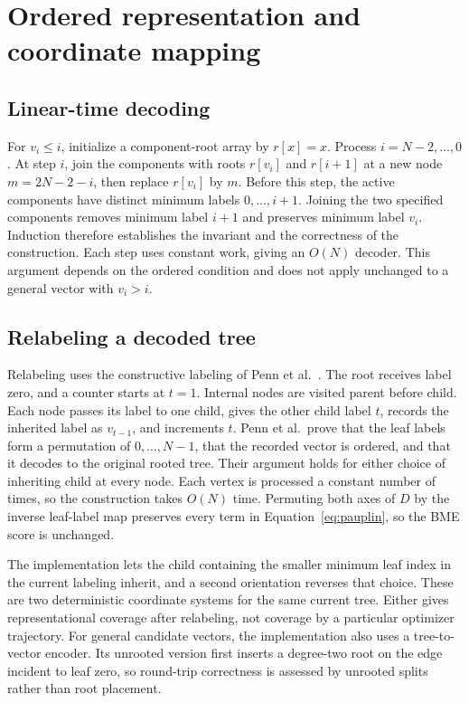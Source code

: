 \section{Ordered representation and coordinate mapping}
\label{sec:gauge}

\subsection{Linear-time decoding}

For $v_i\leq i$, initialize a component-root array by $r[x]=x$.
Process $i=N-2,\ldots,0$.
At step $i$, join the components with roots $r[v_i]$ and $r[i+1]$ at a new node
$m=2N-2-i$, then replace $r[v_i]$ by $m$.
Before this step, the active components have distinct minimum labels $0,\ldots,i+1$.
Joining the two specified components removes minimum label $i+1$ and preserves minimum label $v_i$.
Induction therefore establishes the invariant and the correctness of the construction.
Each step uses constant work, giving an $O(N)$ decoder.
This argument depends on the ordered condition and does not apply unchanged to a general vector with $v_i>i$.

\subsection{Relabeling a decoded tree}

Relabeling uses the constructive labeling of Penn et al.~\cite[Lemmas~0.9--0.11]{penn2023gradme}.
The root receives label zero, and a counter starts at $t=1$.
Internal nodes are visited parent before child.
Each node passes its label to one child, gives the other child label $t$, records the inherited label as $v_{t-1}$, and increments $t$.
Penn et al.\ prove that the leaf labels form a permutation of $0,\ldots,N-1$, that the recorded vector is ordered, and that it decodes to the original rooted tree.
Their argument holds for either choice of inheriting child at every node.
Each vertex is processed a constant number of times, so the construction takes $O(N)$ time.
Permuting both axes of $D$ by the inverse leaf-label map preserves every term in Equation~\eqref{eq:pauplin}, so the BME score is unchanged.

The implementation lets the child containing the smaller minimum leaf index in the current labeling inherit, and a second orientation reverses that choice.
These are two deterministic coordinate systems for the same current tree.
Either gives representational coverage after relabeling, not coverage by a particular optimizer trajectory.
For general candidate vectors, the implementation also uses a tree-to-vector encoder.
Its unrooted version first inserts a degree-two root on the edge incident to leaf zero, so round-trip correctness is assessed by unrooted splits rather than root placement.

